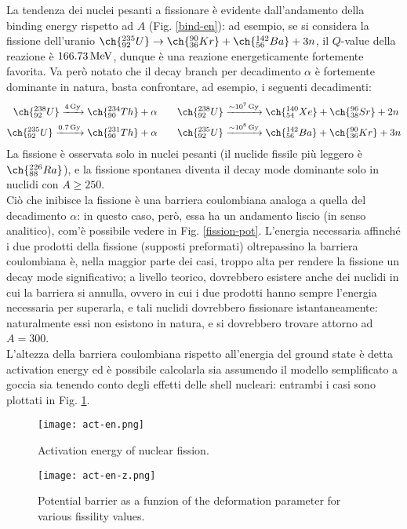 La tendenza dei nuclei pesanti a fissionare è evidente dall'andamento della binding energy rispetto ad $ A $ (Fig. \ref{bind-en}): ad esempio, se si considera la fissione dell'uranio $ \ch{^{235}_{92} U} \rightarrow \ch{^{90}_{36} Kr} + \ch{^{142}_{56} Ba} + 3 n $, il $ Q $-value della reazione è $ 166.73\,\mathrm{MeV} $, dunque è una reazione energeticamente fortemente favorita. Va però notato che il decay branch per decadimento $ \alpha $ è fortemente dominante in natura, basta confrontare, ad esempio, i seguenti decadimenti:
\begin{equation*}
	\begin{split}
		\ch{^{238}_{92} U} \xrightarrow{4\,\text{Gy}} \ch{^{234}_{90} Th} + \alpha &\qquad \ch{^{238}_{92} U} \xrightarrow{\sim 10^7\,\text{Gy}} \ch{^{140}_{54} Xe} + \ch{^{96}_{38} Sr} + 2n\\
		\ch{^{235}_{92} U} \xrightarrow{0.7\,\text{Gy}} \ch{^{231}_{90} Th} + \alpha &\qquad \ch{^{235}_{92} U} \xrightarrow{\sim 10^8\,\text{Gy}} \ch{^{142}_{56} Ba} + \ch{^{90}_{36} Kr} + 3n
	\end{split}
\end{equation*}
La fissione è osservata solo in nuclei pesanti (il nuclide fissile più leggero è $ \ch{^{226}_{88} Ra} $), e la fissione spontanea diventa il decay mode dominante solo in nuclidi con $ A \ge 250 $.\\
Ciò che inibisce la fissione è una barriera coulombiana analoga a quella del decadimento $ \alpha $: in questo caso, però, essa ha un andamento liscio (in senso analitico), com'è possibile vedere in Fig. \ref{fission-pot}. L'energia necessaria affinché i due prodotti della fissione (supposti preformati) oltrepassino la barriera coulombiana è, nella maggior parte dei casi, troppo alta per rendere la fissione un decay mode significativo; a livello teorico, dovrebbero esistere anche dei nuclidi in cui la barriera si annulla, ovvero in cui i due prodotti hanno sempre l'energia necessaria per superarla, e tali nuclidi dovrebbero fissionare istantaneamente: naturalmente essi non esistono in natura, e si dovrebbero trovare attorno ad $ A = 300 $.\\
L'altezza della barriera coulombiana rispetto all'energia del ground state è detta activation energy ed è possibile calcolarla sia assumendo il modello semplificato a goccia sia tenendo conto degli effetti delle shell nucleari: entrambi i casi sono plottati in Fig. \ref{act-en}.

\begin{figure}
	\centering
	\texttt{[image: act-en.png]}
	\caption{Activation energy of nuclear fission.}
	\label{act-en}
\end{figure}
\begin{figure}
	\centering
	\texttt{[image: act-en-z.png]}
	\caption{Potential barrier as a funzion of the deformation parameter for various fissility values.}
	\label{act-en-z}
\end{figure}

